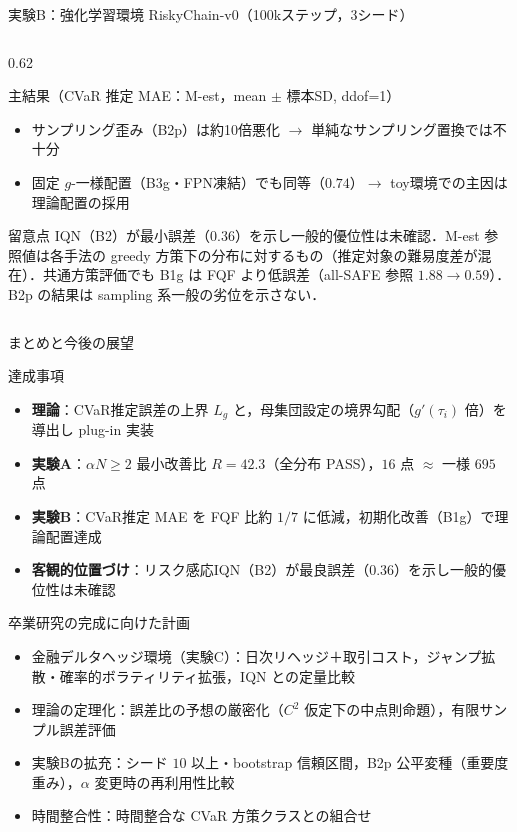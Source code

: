 \documentclass[aspectratio=169, 10pt]{beamer}
\newcommand{\blue}[1]{\textcolor{blue!80!black}{#1}}
\newcommand{\Lg}{L_g}
\begin{document}
\begin{frame}{実験B：強化学習環境 RiskyChain-v0（100kステップ，3シード）}
\begin{columns}[onlytextwidth, T]
\begin{column}{0.62\linewidth}
\begin{exampleblock}{主結果（CVaR 推定 MAE：M-est，mean $\pm$ 標本SD, ddof=1）}
\begin{itemize}
          \item サンプリング歪み（B2p）は約10倍悪化 $\to$ 単純なサンプリング置換では不十分
          \item 固定 $g$-一様配置（B3g・FPN凍結）でも同等（$0.74$）$\to$ toy環境での主因は\blue{理論配置の採用}
        \end{itemize}
      \end{exampleblock}
      \begin{alertblock}{留意点}
        \tiny IQN（B2）が最小誤差（$0.36$）を示し一般的優位性は未確認．M-est 参照値は各手法の greedy 方策下の分布に対するもの（推定対象の難易度差が混在）．共通方策評価でも B1g は FQF より低誤差（all-SAFE 参照 $1.88\to0.59$）．B2p の結果は sampling 系一般の劣位を示さない．
      \end{alertblock}
    \end{column}
  \end{columns}
\end{frame}

\begin{frame}{まとめと今後の展望}
  \begin{exampleblock}{達成事項}
    \begin{itemize}
      \item \textbf{理論}：CVaR推定誤差の上界 $\Lg$ と，母集団設定の境界勾配（$g'(\tau_i)$ 倍）を導出し plug-in 実装
      \item \textbf{実験A}：$\alpha N\ge 2$ 最小改善比 \alert{$R=42.3$}（全分布 PASS），$16$ 点 $\approx$ 一様 $695$ 点
      \item \textbf{実験B}：CVaR推定 MAE を FQF 比\alert{約 $1/7$} に低減，初期化改善（B1g）で理論配置達成
      \item \textbf{客観的位置づけ}：リスク感応IQN（B2）が最良誤差（$0.36$）を示し一般的優位性は未確認
    \end{itemize}
  \end{exampleblock}
  \begin{block}{卒業研究の完成に向けた計画}
    \begin{itemize}
      \item \blue{金融デルタヘッジ環境（実験C）}：日次リヘッジ＋取引コスト，ジャンプ拡散・確率的ボラティリティ拡張，IQN との定量比較
      \item \blue{理論の定理化}：誤差比の予想の厳密化（$C^2$ 仮定下の中点則命題），有限サンプル誤差評価
      \item \blue{実験Bの拡充}：シード $10$ 以上・bootstrap 信頼区間，B2p 公平変種（重要度重み），$\alpha$ 変更時の再利用性比較
      \item \blue{時間整合性}：時間整合な CVaR 方策クラスとの組合せ
    \end{itemize}
  \end{block}
\end{frame}
\end{document}
